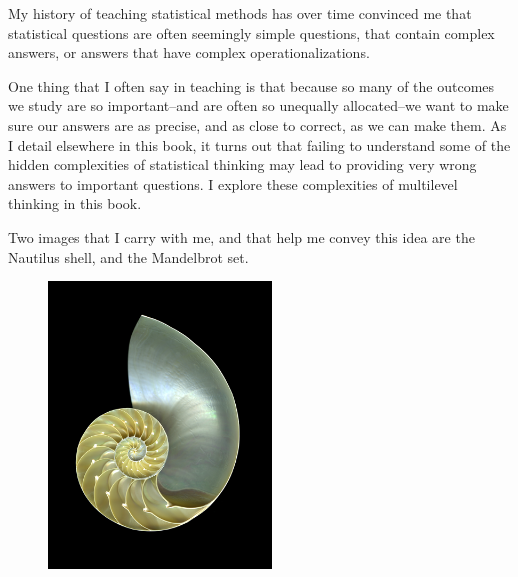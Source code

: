 \documentclass[
  letterpaper,
  DIV=11,
  numbers=noendperiod]{scrreprt}
\begin{document}
\begin{tcolorbox}[enhanced jigsaw, coltitle=black, left=2mm, toprule=.15mm, arc=.35mm, colframe=quarto-callout-tip-color-frame, colback=white, bottomrule=.15mm, breakable, leftrule=.75mm, toptitle=1mm, titlerule=0mm, bottomtitle=1mm, title=\textcolor{quarto-callout-tip-color}{\faLightbulb}\hspace{0.5em}{Complex Answers Hidden Inside Simple Questions}, rightrule=.15mm, opacitybacktitle=0.6, opacityback=0, colbacktitle=quarto-callout-tip-color!10!white]

My history of teaching statistical methods has over time convinced me
that statistical questions are often seemingly simple questions, that
contain complex answers, or answers that have complex
operationalizations.

One thing that I often say in teaching is that because so many of the
outcomes we study are so important--and are often so unequally
allocated--we want to make sure our answers are as precise, and as close
to correct, as we can make them. As I detail elsewhere in this book, it
turns out that failing to understand some of the hidden complexities of
statistical thinking may lead to providing very wrong answers to
important questions. I explore these complexities of multilevel thinking
in this book.

Two images that I carry with me, and that help me convey this idea are
the Nautilus shell, and the Mandelbrot set.

\begin{figure}[H]

\begin{minipage}{0.50\linewidth}

\includegraphics[width=\textwidth,height=3in]{nautilus-new.png}

\end{minipage}%
%
\begin{minipage}{0.50\linewidth}


\end{minipage}
\end{figure}
\end{tcolorbox}
\end{document}
